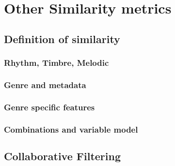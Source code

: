
\chapter{Other Similarity metrics}\label{simmet}

\section{Definition of similarity}

\subsection{Rhythm, Timbre, Melodic}

\subsection{Genre and metadata}

\subsection{Genre specific features}

\subsection{Combinations and variable model}

\section{Collaborative Filtering}

%